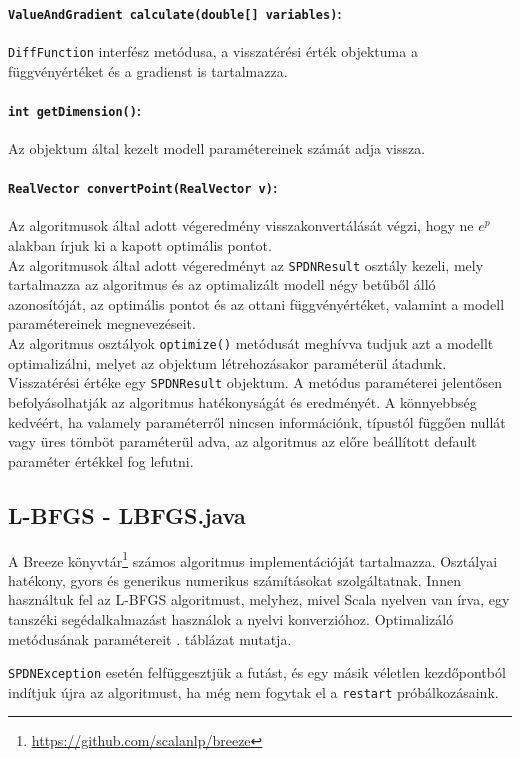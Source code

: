 \paragraph{\texttt{ValueAndGradient calculate(double[] variables)}:} \texttt{DiffFunction} interfész metódusa, a visszatérési érték objektuma a függvényértéket és a gradienst is tartalmazza.
\paragraph{\texttt{int getDimension()}:} Az objektum által kezelt modell paramétereinek számát adja vissza.
\paragraph{\texttt{RealVector convertPoint(RealVector v)}:} Az algoritmusok által adott végeredmény visszakonvertálását végzi, hogy ne $e^p$ alakban írjuk ki a kapott optimális pontot.\\

Az algoritmusok által adott végeredményt az \texttt{SPDNResult} osztály kezeli, mely tartalmazza az algoritmus és az optimalizált modell négy betűből álló azonosítóját, az optimális pontot és az ottani függvényértéket, valamint a modell paramétereinek megnevezéseit. \\

Az algoritmus osztályok \texttt{optimize()} metódusát meghívva tudjuk azt a modellt optimalizálni, melyet az objektum létrehozásakor paraméterül átadunk. Visszatérési értéke egy \texttt{SPDNResult} objektum. A metódus paraméterei jelentősen befolyásolhatják az algoritmus hatékonyságát és eredményét. A könnyebbség kedvéért, ha valamely paraméterről nincsen információnk, típustól függően nullát vagy üres tömböt paraméterül adva, az algoritmus az előre beállított default paraméter értékkel fog lefutni.

\subsection{L-BFGS - LBFGS.java}
A Breeze könyvtár\footnote{\url{https://github.com/scalanlp/breeze}} számos algoritmus implementációját tartalmazza. Osztályai hatékony, gyors és generikus numerikus számításokat szolgáltatnak. Innen használtuk fel az L-BFGS algoritmust, melyhez, mivel Scala nyelven van írva, egy tanszéki segédalkalmazást használok a nyelvi konverzióhoz. Optimalizáló metódusának paramétereit . táblázat mutatja.

\texttt{SPDNException} esetén felfüggesztjük a futást, és egy másik véletlen kezdőpontból indítjuk újra az algoritmust, ha még nem fogytak el a \texttt{restart} próbálkozásaink.

